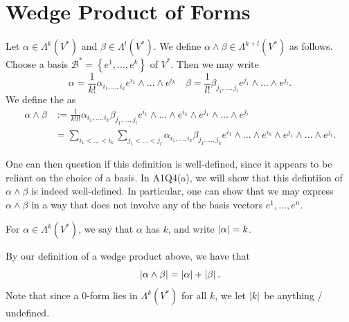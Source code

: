\documentclass[notoc,notitlepage]{tufte-book}
\begin{document}

\section{Wedge Product of Forms}%
\label{sec:wedge_product_of_forms}

\begin{defn}\label{defn:wedge_product}
  Let $\alpha \in \Lambda^k(V^*)$ and $\beta \in \Lambda^l(V^*)$. We define
  $\alpha \wedge \beta \in \Lambda^{k + l}(V^*)$ as follows. Choose a basis
  $\mathcal{B}^* = \left\{ e^1, \ldots, e^k \right\}$ of  $V^*$. Then we
  may write
  \begin{equation*}
    \alpha = \frac{1}{k!} \alpha_{i_1, \ldots, i_k} e^{i_1} \wedge \hdots \wedge e^{i_k} \quad
    \beta = \frac{1}{l!} \beta_{j_1, \ldots, j_l} e^{j_1} \wedge \hdots \wedge e^{j_l}.
  \end{equation*}
  We define the  as
  \begin{align*}
    \alpha \wedge \beta
      &:= \frac{1}{k! l!} \alpha_{i_1, \ldots, i_k} \beta_{j_1, \ldots, j_l}
      e^{i_1} \wedge \hdots \wedge e^{i_k} \wedge e^{j_1} \wedge \hdots \wedge e^{j_l} \\
      &= \sum_{i_1 < \hdots < i_k} \sum_{j_1 < \hdots < j_l}
        \alpha_{i_1, \ldots, i_k} \beta_{j_1, \ldots, j_k}
      e^{i_1} \wedge \hdots \wedge e^{i_k} \wedge e^{j_1} \wedge \hdots \wedge e^{j_l}.
  \end{align*}
\end{defn}

One can then question if this definition is well-defined, since it appears to be
reliant on the choice of a basis. In A1Q4(a), we will show that this defintiion
of $\alpha \wedge \beta$ is indeed well-defined. In particular, one can show that
we may express $\alpha \wedge \beta$ in a way that does not involve any of the
basis vectors $e^1, \ldots, e^n$.

\begin{defn}\label{defn:degree_of_a_form}
  For $\alpha \in \Lambda^k(V^*)$, we say that $\alpha$ has  $k$,
  and write $\left|\alpha\right| = k$.
\end{defn}

\begin{note}
  By our definition of a wedge product above, we have that
  \begin{equation*}
    \left|\alpha \wedge \beta\right| = \left|\alpha\right| + \left|\beta\right|.
  \end{equation*}
  Note that since a $0$-form lies in $\Lambda^k(V^*)$ for all $k$, we let $\left|k\right|$
  be anything / undefined.
\end{note}
\end{document}

